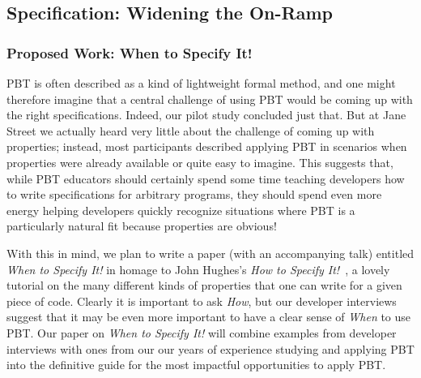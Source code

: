 \subsection{Specification: Widening the On-Ramp }\label{sec:spec}


\subsubsection{Proposed Work: When to Specify It!}
PBT is often described as a kind of lightweight formal method, and one
might therefore imagine that a central challenge of using PBT would be
coming up with the
right specifications. Indeed, our pilot study concluded just that. But at
Jane Street we actually heard very little about the challenge of coming up with
properties; instead, most participants described applying PBT in scenarios when
properties were already available or quite easy to imagine. This suggests that,
while PBT educators should certainly spend some time teaching developers how to
write specifications for arbitrary programs, they should spend even more energy
helping developers quickly recognize  situations where PBT is a particularly
natural fit because properties are obvious!

With this in mind, we plan to write a paper
(with an accompanying talk)
entitled {\em When to Specify It!} in homage to
John Hughes's {\em How to Specify It!}~\cite{HowToSpecifyIt}, a lovely
tutorial on the many different kinds of properties that one can write
for a given piece
of code. Clearly it is important to ask {\em How}, but our developer interviews
suggest that it may be even more important to have a clear sense of {\em When}
to use PBT. Our paper on {\em When to Specify It!} will combine examples from developer
interviews with ones from our our years of experience studying and applying PBT
into the definitive guide for the most impactful opportunities to apply PBT.
\iflater{}
\fi

